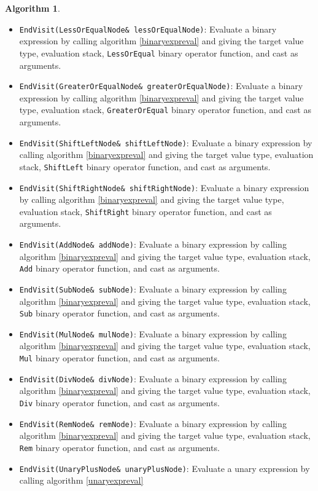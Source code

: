 \documentclass[a4paper,oneside,11pt]{book}
\theoremstyle{definition}
\newtheorem{algo}{Algorithm}[section]
\begin{document}
\begin{algo}
\begin{itemize}
\item
\verb|EndVisit(LessOrEqualNode& lessOrEqualNode)|:
Evaluate a binary expression by calling algorithm \ref{binaryexpreval}
and giving the target value type, evaluation stack, \verb|LessOrEqual| binary operator function, and cast as arguments.
\item
\verb|EndVisit(GreaterOrEqualNode& greaterOrEqualNode)|:
Evaluate a binary expression by calling algorithm \ref{binaryexpreval}
and giving the target value type, evaluation stack, \verb|GreaterOrEqual| binary operator function, and cast as arguments.
\item
\verb|EndVisit(ShiftLeftNode& shiftLeftNode)|:
Evaluate a binary expression by calling algorithm \ref{binaryexpreval}
and giving the target value type, evaluation stack, \verb|ShiftLeft| binary operator function, and cast as arguments.
\item
\verb|EndVisit(ShiftRightNode& shiftRightNode)|:
Evaluate a binary expression by calling algorithm \ref{binaryexpreval}
and giving the target value type, evaluation stack, \verb|ShiftRight| binary operator function, and cast as arguments.
\item
\verb|EndVisit(AddNode& addNode)|:
Evaluate a binary expression by calling algorithm \ref{binaryexpreval}
and giving the target value type, evaluation stack, \verb|Add| binary operator function, and cast as arguments.
\item
\verb|EndVisit(SubNode& subNode)|:
Evaluate a binary expression by calling algorithm \ref{binaryexpreval}
and giving the target value type, evaluation stack, \verb|Sub| binary operator function, and cast as arguments.
\item
\verb|EndVisit(MulNode& mulNode)|:
Evaluate a binary expression by calling algorithm \ref{binaryexpreval}
and giving the target value type, evaluation stack, \verb|Mul| binary operator function, and cast as arguments.
\item
\verb|EndVisit(DivNode& divNode)|:
Evaluate a binary expression by calling algorithm \ref{binaryexpreval}
and giving the target value type, evaluation stack, \verb|Div| binary operator function, and cast as arguments.
\item
\verb|EndVisit(RemNode& remNode)|:
Evaluate a binary expression by calling algorithm \ref{binaryexpreval}
and giving the target value type, evaluation stack, \verb|Rem| binary operator function, and cast as arguments.
\item
\verb|EndVisit(UnaryPlusNode& unaryPlusNode)|:
Evaluate a unary expression by calling algorithm \ref{unaryexpreval}

\end{itemize}
\end{algo}
\end{document}
